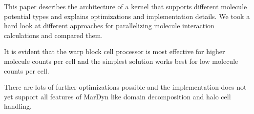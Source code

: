 This paper describes the architecture of a \cuda{} kernel that supports different molecule potential types and explains optimizations and implementation details.
We took a hard look at different approaches for parallelizing molecule interaction calculations and compared them.

It is evident that the warp block cell processor is most effective for higher molecule counts per cell and the simplest solution works best for low molecule counts per cell.

There are lots of further optimizations possible and the \cuda{} implementation does not yet support all features of MarDyn like domain decomposition and halo cell handling.